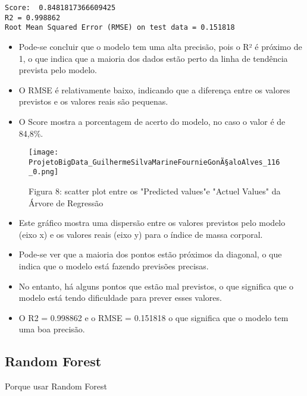 \documentclass[11pt]{article}
\providecommand{\tightlist}{%
      \setlength{\itemsep}{0pt}\setlength{\parskip}{0pt}}
\begin{document}
    \begin{Verbatim}[commandchars=\\\{\}]
Score:  0.8481817366609425
R2 = 0.998862
Root Mean Squared Error (RMSE) on test data = 0.151818
    \end{Verbatim}

    \begin{itemize}
\tightlist
\item
  Pode-se concluir que o modelo tem uma alta precisão, pois o R² é
  próximo de 1, o que indica que a maioria dos dados estão perto da
  linha de tendência prevista pelo modelo.
\item
  O RMSE é relativamente baixo, indicando que a diferença entre os
  valores previstos e os valores reais são pequenas.
\item
  O Score mostra a porcentagem de acerto do modelo, no caso o valor é de
  84,8\%.
\end{itemize}


\begin{figure}[h]
   \centering
   \texttt{[image: ProjetoBigData\_GuilhermeSilvaMarineFournieGonÃ§aloAlves\_116\_0.png]}
   \pagebreak
    \caption{Figura 8: scatter plot entre os "Predicted values"e "Actuel Values" da Árvore de Regressão}
    \pagebreak
   \label{fig:scatter plot1}
\end{figure}

    
    \begin{itemize}
\tightlist
\item
  Este gráfico mostra uma dispersão entre os valores previstos pelo
  modelo (eixo x) e os valores reais (eixo y) para o índice de massa
  corporal.
\item
  Pode-se ver que a maioria dos pontos estão próximos da diagonal, o que
  indica que o modelo está fazendo previsões precisas.
\item
  No entanto, há alguns pontos que estão mal previstos, o que significa
  que o modelo está tendo dificuldade para prever esses valores.
\item
  O R2 = 0.998862 e o RMSE = 0.151818 o que significa que o modelo tem
  uma boa precisão.
\end{itemize}

    \hypertarget{random-forest}{%
\subsection{Random Forest}\label{random-forest}}

Porque usar Random Forest
\end{document}
